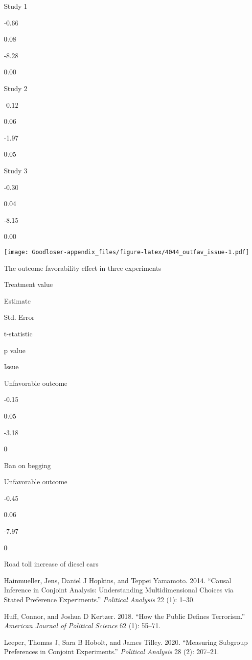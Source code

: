 \documentclass[
]{book}
\begin{document}
Study 1

-0.66

0.08

-8.28

0.00

Study 2

-0.12

0.06

-1.97

0.05

Study 3

-0.30

0.04

-8.15

0.00

\texttt{[image: Goodloser-appendix\_files/figure-latex/4044\_outfav\_issue-1.pdf]}

The outcome favorability effect in three experiments

Treatment value

Estimate

Std. Error

t-statistic

p value

Issue

Unfavorable outcome

-0.15

0.05

-3.18

0

Ban on begging

Unfavorable outcome

-0.45

0.06

-7.97

0

Road toll increase of diesel cars

\hypertarget{refs}{}
\leavevmode\hypertarget{ref-hainmueller2014causal}{}%
Hainmueller, Jens, Daniel J Hopkins, and Teppei Yamamoto. 2014. ``Causal
Inference in Conjoint Analysis: Understanding Multidimensional Choices
via Stated Preference Experiments.'' \emph{Political Analysis} 22 (1):
1--30.

\leavevmode\hypertarget{ref-huff2018public}{}%
Huff, Connor, and Joshua D Kertzer. 2018. ``How the Public Defines
Terrorism.'' \emph{American Journal of Political Science} 62 (1):
55--71.

\leavevmode\hypertarget{ref-leeper2020measuring}{}%
Leeper, Thomas J, Sara B Hobolt, and James Tilley. 2020. ``Measuring
Subgroup Preferences in Conjoint Experiments.'' \emph{Political
Analysis} 28 (2): 207--21.

\backmatter
\end{document}
